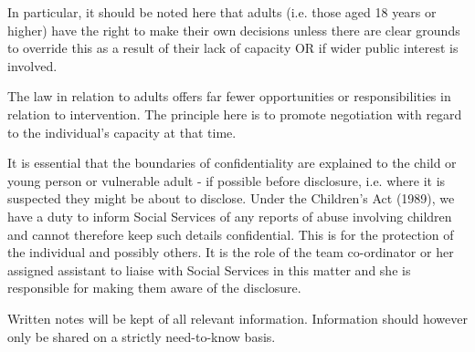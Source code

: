 In particular, it should be noted here that adults (i.e. those aged 18 years or
higher) have the right to make their own decisions unless there are clear
grounds to override this as a result of their lack of capacity OR if wider
public interest is involved.

The law in relation to adults offers far fewer opportunities or
responsibilities in relation to intervention. The principle here is to promote
negotiation with regard to the individual's capacity at that time.

It is essential that the boundaries of confidentiality are explained to the
child or young person or vulnerable adult - if possible before disclosure, i.e.
where it is suspected they might be about to disclose. Under the Children's Act
(1989), we have a duty to inform Social Services of any reports of abuse
involving children and cannot therefore keep such details confidential. This is
for the protection of the individual and possibly others. It is the role of the
team co-ordinator or her assigned assistant to liaise with Social Services in
this matter and she is responsible for making them aware of the disclosure.

Written notes will be kept of all relevant information. Information should
however only be shared on a strictly need-to-know basis.
